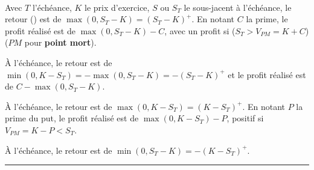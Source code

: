\begin{f}

\ %


Avec \(T\) l'échéance, \(K\) le prix d'exercice, \(S\) ou \(S_T\) le sous-jacent à l'échéance, le retour () est de \(\max (0, S_T-K)=( S_T-K)^{+}\).
En notant \(C\) la prime, le profit réalisé est de \(\max (0, S_T-K)-C\), avec un profit si  (\(S_T>V_{PM}=K + C\))  (\(PM\) pour \textbf{point mort}).

		


\medskip



À l'échéance, le retour est de \(\min (0,K- S_T)=-\max(0, S_T-K)=-( S_T-K)^{+}\) et le profit réalisé est de \(C-\max (0, S_T-K)\).

\medskip

		
\medskip



À l'échéance, le retour est de \(\max (0,K- S_T)=(K- S_T)^{+}\).
En notant \(P\) la prime du put, le profit réalisé est de \(\max (0,K- S_T)-P\), positif si\(V_{PM}=K -P<S_T\).

\medskip

	    	     


\medskip

	    	     

À l'échéance, le retour est de \(\min (0, S_T-K)=-(K- S_T)^+\).


\end{f}
\hrule

